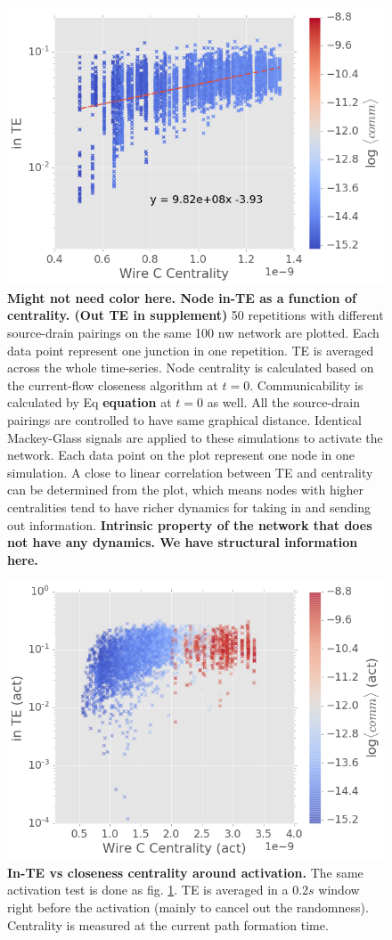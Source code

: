 \documentclass[fleqn,10pt,  amsmath,amssymb,aps]{wlscirep}
\begin{document}
\begin{figure}[h]
	\centering
	\includegraphics[width=0.5\linewidth]{figure/in_TE}
	\caption{\textbf{Might not need color here. Node in-TE as a function of centrality. (Out TE in  supplement)} 50 repetitions with different source-drain pairings on the same 100 nw network are plotted. Each data point represent one junction in one repetition. TE is averaged across the whole time-series. Node centrality is calculated based on the current-flow closeness algorithm at $t = 0$. Communicability is calculated by Eq \textbf{equation} at $t = 0$ as well. All the source-drain pairings are controlled to have same graphical distance. Identical Mackey-Glass signals are applied to these simulations to activate the network. Each data point on the plot represent one node in one simulation. A close to linear correlation between TE and centrality can be determined from the plot, which means nodes with higher centralities tend to have richer dynamics for taking in and sending out information.
	\textbf{Intrinsic property of the network that does not have any dynamics. We have structural information here.}}
	\label{fig:in_te}
\end{figure}

\begin{figure}[h]
	\centering
	\includegraphics[width=0.5\linewidth]{figure/TE_cent_act}
	\caption{\textbf{In-TE vs closeness centrality around activation.} The same activation test is done as fig. \ref{fig:in_te}.	TE is averaged in a $0.2s$ window right before the activation (mainly to cancel out the randomness). Centrality is measured at the current path formation time.}
	\label{fig:TE_cent_act}
\end{figure}
\end{document}
